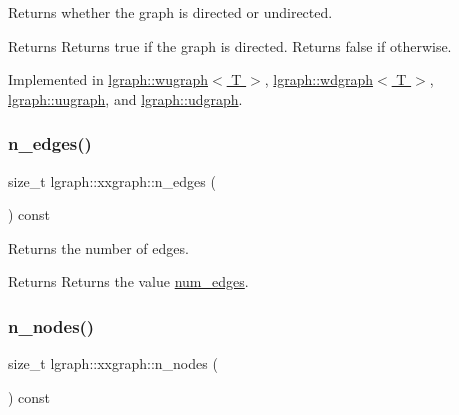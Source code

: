Returns whether the graph is directed or undirected. 

\begin{DoxyReturn}{Returns}
Returns true if the graph is directed. Returns false if otherwise. 
\end{DoxyReturn}


Implemented in \hyperlink{classlgraph_1_1wugraph_a1614f4e23aa04055c64816c001cd093d}{lgraph\+::wugraph$<$ T $>$}, \hyperlink{classlgraph_1_1wdgraph_ab167f7c833e7db1a74e65a187f583ed4}{lgraph\+::wdgraph$<$ T $>$}, \hyperlink{classlgraph_1_1uugraph_ab8d27a5e1459960284ac0b334de91ff0}{lgraph\+::uugraph}, and \hyperlink{classlgraph_1_1udgraph_ab346eaf76d049a5148ffd87cda7eab6a}{lgraph\+::udgraph}.

\mbox{\label{classlgraph_1_1xxgraph_af00bce8b07a42754601d1e3bebe2c1fa}} 
\subsubsection{\texorpdfstring{n\+\_\+edges()}{n\_edges()}}
{\footnotesize\ttfamily size\+\_\+t lgraph\+::xxgraph\+::n\+\_\+edges (\begin{DoxyParamCaption}{ }\end{DoxyParamCaption}) const\hspace{0.3cm}{\ttfamily [inherited]}}



Returns the number of edges. 

\begin{DoxyReturn}{Returns}
Returns the value \hyperlink{classlgraph_1_1xxgraph_a6765a9a3be42f6e0f824635c593b35d7}{num\+\_\+edges}. 
\end{DoxyReturn}
\mbox{\label{classlgraph_1_1xxgraph_a67f651617ada4053b569102b9a54cab0}} 
\subsubsection{\texorpdfstring{n\+\_\+nodes()}{n\_nodes()}}
{\footnotesize\ttfamily size\+\_\+t lgraph\+::xxgraph\+::n\+\_\+nodes (\begin{DoxyParamCaption}{ }\end{DoxyParamCaption}) const\hspace{0.3cm}{\ttfamily [inherited]}}



